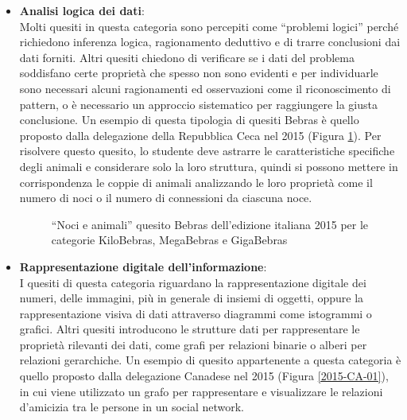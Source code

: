 \documentclass[12pt]{report}
\begin{document}
\begin{itemize}
\bigskip	
	\item \textbf{Analisi logica dei dati}: 
	\\
	Molti quesiti in questa categoria sono percepiti come ``problemi logici'' perché richiedono inferenza logica, ragionamento deduttivo e di trarre conclusioni dai dati forniti.
	Altri quesiti chiedono di verificare se i dati del problema soddisfano certe proprietà che spesso non sono evidenti e per individuarle sono necessari alcuni ragionamenti ed osservazioni come il riconoscimento di pattern, o è necessario un approccio sistematico per raggiungere la giusta conclusione.
	Un esempio di questa tipologia di quesiti Bebras è quello proposto dalla delegazione della Repubblica Ceca nel 2015 (Figura \ref{2015-CZ-01}). Per risolvere questo quesito, lo studente deve astrarre le caratteristiche specifiche degli animali e considerare solo la loro struttura, quindi si possono mettere in corrispondenza le coppie di animali analizzando le loro proprietà come il numero di noci o il numero di connessioni da ciascuna noce.
	
	\begin{figure}[h]
		\centering
		\caption{``Noci e animali'' quesito Bebras dell'edizione italiana 2015 per le categorie KiloBebras, MegaBebras e GigaBebras}\label{2015-CZ-01}
	\end{figure}

\bigskip
	\item \textbf{Rappresentazione digitale dell'informazione}: 
	\\
	I quesiti di questa categoria riguardano la rappresentazione digitale dei numeri, delle immagini, più in generale di insiemi di oggetti, oppure la rappresentazione visiva di dati attraverso diagrammi come istogrammi o grafici.
	Altri quesiti introducono le strutture dati per rappresentare le proprietà rilevanti dei dati, come grafi per relazioni binarie o alberi per relazioni gerarchiche. Un esempio di quesito appartenente a questa categoria è quello proposto dalla delegazione Canadese nel 2015 (Figura \ref{2015-CA-01}), in cui viene utilizzato un grafo per rappresentare e visualizzare le relazioni d'amicizia tra le persone in un social network.
	

\end{itemize}
\end{document}

